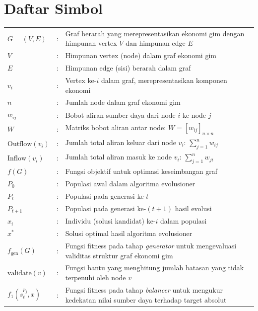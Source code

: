 \chapter*{Daftar Simbol}
\begin{center}
\small %
\renewcommand{\arraystretch}{1.05} %
\setlength{\tabcolsep}{4pt} %
\begin{tabular}{p{2.5cm}p{0.2cm}p{10cm}} %
$G = (V, E)$ & : & Graf berarah yang merepresentasikan ekonomi gim dengan himpunan vertex $V$ dan himpunan edge $E$ \\
$V$ & : & Himpunan vertex (node) dalam graf ekonomi gim \\
$E$ & : & Himpunan edge (sisi) berarah dalam graf \\
$v_i$ & : & Vertex ke-$i$ dalam graf, merepresentasikan komponen ekonomi \\
$n$ & : & Jumlah node dalam graf ekonomi gim \\
$w_{ij}$ & : & Bobot aliran sumber daya dari node $i$ ke node $j$ \\
$W$ & : & Matriks bobot aliran antar node: $W = [w_{ij}]_{n \times n}$ \\
$\text{Outflow}(v_i)$ & : & Jumlah total aliran keluar dari node $v_i$: $\sum_{j=1}^{n} w_{ij}$ \\
$\text{Inflow}(v_i)$ & : & Jumlah total aliran masuk ke node $v_i$: $\sum_{j=1}^{n} w_{ji}$ \\
$f(G)$ & : & Fungsi objektif untuk optimasi keseimbangan graf \\
$P_0$ & : & Populasi awal dalam algoritma evolusioner \\
$P_t$ & : & Populasi pada generasi ke-$t$ \\
$P_{t+1}$ & : & Populasi pada generasi ke-$(t+1)$ hasil evolusi \\
$x_i$ & : & Individu (solusi kandidat) ke-$i$ dalam populasi \\
$x^*$ & : & Solusi optimal hasil algoritma evolusioner \\
$f_{\text{gen}}(G)$ & : & Fungsi fitness pada tahap \textit{generator} untuk mengevaluasi validitas struktur graf ekonomi gim \\
$\mathrm{validate}(v)$ & : & Fungsi bantu yang menghitung jumlah batasan yang tidak terpenuhi oleh node $v$ \\
$f_1(s^{p_j}_t, x)$ & : & Fungsi fitness pada tahap \textit{balancer} untuk mengukur kedekatan nilai sumber daya terhadap target absolut \\

\end{tabular}
\end{center}
